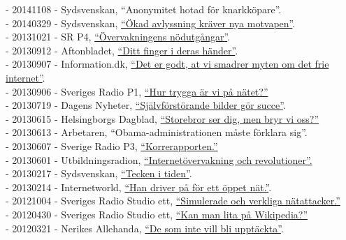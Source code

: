 \documentclass[a4paper,11pt,oneside]{article}
\begin{document}
{    - 20141108 - Sydsvenskan, ``Anonymitet hotad för knarkköpare''. \\
    - 20140329 - Sydsvenskan, \href{http://www.sydsvenskan.se/2014-03-29/okad-avlyssning-kraver-nya-motvapen}{``Ökad avlyssning kräver nya motvapen''}.\\
    - 20131021 - SR P4, \href{http://t.sr.se/NC8sUF}{``Övervakningens nödutgångar''}. \\
    - 20130912 - Aftonbladet, \href{http://www.aftonbladet.se/nyheter/vetmer/article17455373.ab}{``Ditt finger i deras händer''}. \\
    - 20130907 - Information.dk, \href{http://www.information.dk/471440}{``Det er godt, at vi smadrer myten om det frie internet''}. \\
    - 20130906 - Sveriges Radio P1, \href{http://t.sr.se/OfP0gG}{``Hur trygga är vi på nätet?''} \\
    - 20130719 - Dagens Nyheter, \href{http://www.dn.se/kultur-noje/sjalvforstorande-bilder-gor-succe/}{``Självförstörande bilder gör succe''}. \\
    - 20130615 - Helsingborgs Dagblad, \href{http://www.hd.se/2013-06-15/storebror-ser-dig---men-bryr-vi-oss}{``Storebror ser dig, men bryr vi oss?''} \\
    - 20130613 - Arbetaren, ``Obama-administrationen måste förklara sig''. \\
    - 20130607 - Sverige Radio P3, \href{http://t.sr.se/MiZb35}{``Korrerapporten.''} \\
    - 20130601 - Utbildningsradion, \href{http://urskola.se/Produkter/176858-UR-Samtiden-Overvakning-och-kontroll-Internetovervakning-och-revolutioner}{``Internetövervakning och revolutioner''.} \\
    - 20130217 - Sydsvenskan, \href{http://www.sydsvenskan.se/2013-02-17/tecken-i-tiden}{``Tecken i tiden''}.\\
    - 20130214 - Internetworld, \href{http://www.idg.se/2.1085/1.492033/han-driver-pa-for-ett-oppet-nat}{``Han driver på för ett öppet nät.''}. \\
    - 20121004 - Sveriges Radio Studio ett, \href{http://t.sr.se/1foOdCK}{``Simulerade och verkliga nätattacker.''} \\
    - 20120430 - Sveriges Radio Studio ett, \href{http://t.sr.se/1cRSOfk}{``Kan man lita på Wikipedia?''} \\
    - 20120321 - Nerikes Allehanda, \href{http://na.se/nyheter/orebro/1.1589481--de-som-inte-vill-blir-inte-upptackta-}{``De som inte vill bli upptäckta''}. \\
}
\end{document}
